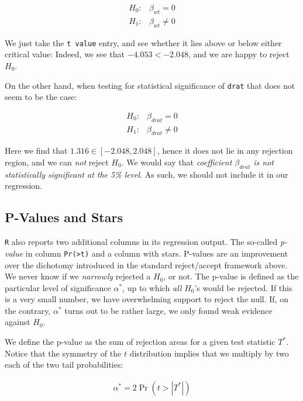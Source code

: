 \documentclass[]{book}
\begin{document}
\begin{align}
H_0:& \beta_{wt} = 0\\
H_1:& \beta_{wt} \neq 0 \label{eq:mtcarswt}
\end{align}

We just take the \texttt{t\ value} entry, and see whether it lies above or below either critical value: Indeed, we see that \(-4.053 < -2.048\), and we are happy to reject \(H_0\).

On the other hand, when testing for statistical significance of \texttt{drat} that does not seem to be the case:

\begin{align}
H_0:& \beta_{drat} = 0\\
H_1:& \beta_{drat} \neq 0 \label{eq:mtcarsdrat}
\end{align}

Here we find that \(1.316 \in [-2.048,2.048]\), hence it does not lie in any rejection region, and we can \emph{not} reject \(H_0\). We would say that \emph{coefficient \(\beta_{drat}\) is not statistically significant at the 5\% level}. As such, we should not include it in our regression.

\hypertarget{p-values-and-stars}{%
\subsection{P-Values and Stars}\label{p-values-and-stars}}

\texttt{R} also reports two additional columns in its regression output. The so-called \emph{p-value} in column \texttt{Pr(\textgreater{}\textbar{}t\textbar{})} and a column with stars. P-values are an improvement over the dichotomy introduced in the standard reject/accept framework above. We never know if we \emph{narrowly} rejected a \(H_0\), or not. The p-value is defined as the particular level of significance \(\alpha^*\), up to which \emph{all} \(H_0\)'s would be rejected. If this is a very small number, we have overwhelming support to reject the null. If, on the contrary, \(\alpha^*\) turns out to be rather large, we only found weak evidence against \(H_0\).

We define the p-value as the sum of rejection areas for a given test statistic \(T^*\). Notice that the symmetry of the \(t\) distribution implies that we multiply by two each of the two tail probabilities:

\begin{align}
\alpha^* = 2 \Pr(t > |T^*|) 
\end{align}
\end{document}
